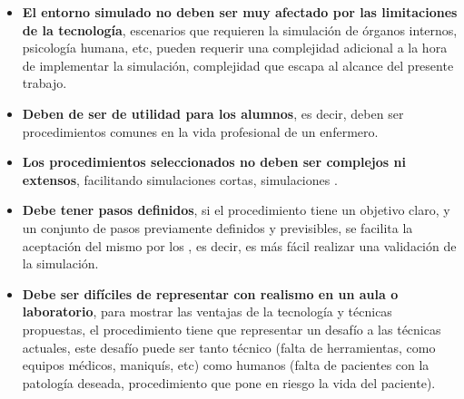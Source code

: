 \begin{itemize}
\item \textbf{El entorno simulado no deben ser muy afectado por las limitaciones
        de la tecnología}, escenarios que requieren la
    simulación de órganos internos, psicología humana, etc, pueden requerir una
    complejidad adicional a la hora de implementar la simulación, complejidad
    que escapa al alcance del presente trabajo.
\item \textbf{Deben de ser de utilidad para los alumnos}, es decir, deben ser
    procedimientos comunes en la vida profesional de un enfermero. \item
    \textbf{Los procedimientos seleccionados no deben ser complejos ni
        extensos}, facilitando simulaciones cortas, simulaciones .
\item \textbf{Debe tener pasos definidos}, si el procedimiento tiene un objetivo claro,
    y un conjunto de pasos previamente definidos y previsibles, se facilita la
    aceptación del mismo por los , es
    decir, es más fácil realizar una validación de la simulación.
\item \textbf{Debe ser difíciles de representar con realismo en un aula o
        laboratorio}, para mostrar las ventajas de la tecnología y técnicas
    propuestas, el procedimiento tiene que representar un desafío a las técnicas
    actuales, este desafío puede ser tanto técnico (falta de herramientas, como
    equipos médicos, maniquís, etc) como humanos (falta de pacientes con la
    patología deseada, procedimiento que pone en riesgo la vida del
    paciente).
\end{itemize}


